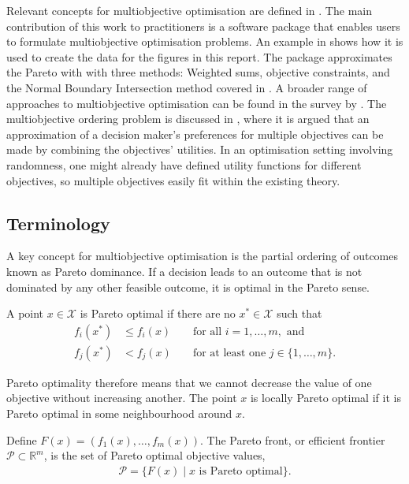 \documentclass[main.tex]{subfiles}
\begin{document}
Relevant concepts for multiobjective optimisation are defined in
.  The main contribution of this work to
practitioners is a software package that enables users to formulate
multiobjective optimisation problems.  An example in
 shows how it is used to create the data for
the figures in this report.  The package approximates the Pareto with
with three methods: Weighted sums, objective
constraints, and the Normal Boundary Intersection method covered in
.  A broader range of
approaches to multiobjective optimisation can be found in the survey
by \citet{marler2004survey}.  The multiobjective ordering problem is
discussed in , where it is argued that an
approximation of a decision maker's preferences for multiple
objectives can be made by combining the objectives' utilities. In an
optimisation setting involving randomness, one might already have
defined utility functions for different objectives, so multiple
objectives easily fit within the existing theory.


\subsection{Terminology}\label{sec:multi_terminology}
A key concept for multiobjective optimisation is the partial
ordering of outcomes known as Pareto dominance. If a decision leads to
an outcome that is not dominated by any other feasible outcome, it is
optimal in the Pareto sense.
\begin{mydef}
  A point $x\in\mathcal{X}$ is Pareto optimal if there are no
  $x^*\in\mathcal{X}$ such that
  \begin{align}
    f_i(x^*)&\leq f_i(x) &&\text{ for all } i = 1,\dots,m, \text{ and}\\
    f_j(x^*)&<f_j(x) &&\text{ for at least one } j \in \{1,\dots,m\}.
  \end{align}
\end{mydef}
Pareto optimality therefore means that we cannot decrease the value of
one objective without increasing another.
The point $x$ is locally Pareto optimal if it is Pareto optimal in
some neighbourhood around $x$.
\begin{mydef}
  Define $F(x) = (f_1(x),\dots,f_m(x))$.
  The Pareto front, or efficient frontier $\mathcal{P}\subset
  \mathbb{R}^m$, is the set of
  Pareto optimal objective values,
  \begin{align}
    \mathcal{P} = \{F(x) \mid x \text{ is Pareto optimal}\}.
  \end{align}
\end{mydef}
\end{document}
